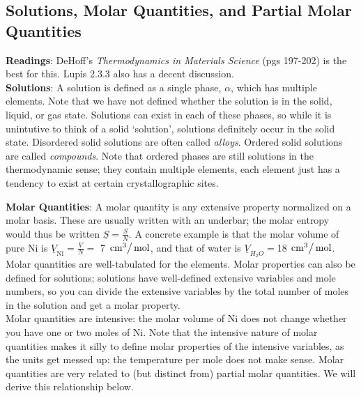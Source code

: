 \documentclass[12pt]{article}
\begin{document}
\subsection{Solutions, Molar Quantities, and Partial Molar Quantities}
\textbf{Readings}: DeHoff{'}s \textit{ Thermodynamics in Materials Science} (pgs 197-202) is the best for this. Lupis 2.3.3 also has a decent discussion.\\
\textbf{Solutions}: A solution is defined as a single phase, $\alpha$, which has multiple elements. Note that we have not defined whether the solution is in the solid, liquid, or gas state. Solutions can exist in each of these phases, so while it is unintutive to think of a solid `solution', solutions definitely occur in the solid state. Disordered solid solutions are often called \emph{alloys}. Ordered solid solutions are called \emph{compounds}. Note that ordered phases are still solutions in the thermodynamic sense; they contain multiple elements, each element just has a tendency to exist
at certain crystallographic sites.

\textbf{Molar Quantities}: A molar quantity is any extensive property normalized on a molar basis. These are usually written with an underbar; the molar entropy would thus be written $\underline{S}=\frac{S}{N}$. A concrete example is that the molar volume of pure Ni is $\underline{V}_{\text{Ni}}=\frac{V}{N}=$ 7 $\left.\text{cm}^3\right/\text{mol}$, and that of water is $\underline{V}_{H_2O}=$18 $\left.\text{cm}^3\right/\text{mol}$. Molar quantities are well-tabulated for the elements. Molar properties can also be defined for solutions; solutions have well-defined extensive variables and mole numbers, so you can divide the extensive variables by the total number of moles in the solution and get a molar property.\\

Molar quantities are intensive: the molar volume of Ni does not change whether you have one or two moles of Ni. Note that the intensive nature of molar quantities makes it silly to define molar properties of the intensive variables, as the units get messed up: the temperature per mole does not make sense. Molar quantities are very related to (but distinct from) partial molar quantities. We will derive this relationship below.\\
\end{document}
